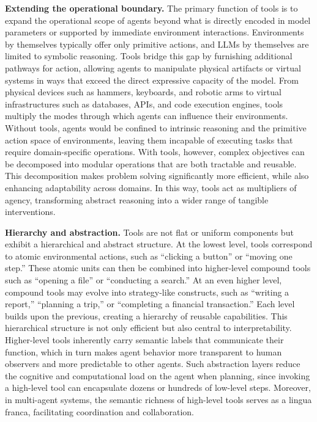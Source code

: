 \documentclass[11pt]{article}
\begin{document}
\textbf{Extending the operational boundary.}  
The primary function of tools is to expand the operational scope of agents beyond what is directly encoded in model parameters or supported by immediate environment interactions. Environments by themselves typically offer only primitive actions, and LLMs by themselves are limited to symbolic reasoning. Tools bridge this gap by furnishing additional pathways for action, allowing agents to manipulate physical artifacts or virtual systems in ways that exceed the direct expressive capacity of the model. From physical devices such as hammers, keyboards, and robotic arms to virtual infrastructures such as databases, APIs, and code execution engines, tools multiply the modes through which agents can influence their environments. Without tools, agents would be confined to intrinsic reasoning and the primitive action space of environments, leaving them incapable of executing tasks that require domain-specific operations. With tools, however, complex objectives can be decomposed into modular operations that are both tractable and reusable. This decomposition makes problem solving significantly more efficient, while also enhancing adaptability across domains. In this way, tools act as multipliers of agency, transforming abstract reasoning into a wider range of tangible interventions.  

\textbf{Hierarchy and abstraction.}  
Tools are not flat or uniform components but exhibit a hierarchical and abstract structure. At the lowest level, tools correspond to atomic environmental actions, such as ``clicking a button'' or ``moving one step.'' These atomic units can then be combined into higher-level compound tools such as ``opening a file'' or ``conducting a search.'' At an even higher level, compound tools may evolve into strategy-like constructs, such as ``writing a report,'' ``planning a trip,'' or ``completing a financial transaction.'' Each level builds upon the previous, creating a hierarchy of reusable capabilities. This hierarchical structure is not only efficient but also central to interpretability. Higher-level tools inherently carry semantic labels that communicate their function, which in turn makes agent behavior more transparent to human observers and more predictable to other agents. Such abstraction layers reduce the cognitive and computational load on the agent when planning, since invoking a high-level tool can encapsulate dozens or hundreds of low-level steps. Moreover, in multi-agent systems, the semantic richness of high-level tools serves as a lingua franca, facilitating coordination and collaboration.  
\end{document}
